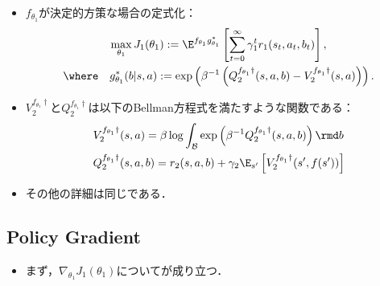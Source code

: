 \documentclass[a4paper,10pt,dvipdfmx]{jsarticle}
\begin{document}
\begin{itemize}
    \item $f_{\theta_1}$が決定的方策な場合の定式化：
    \begin{gather}
        \max_{\theta_1} J_1(\theta_1):=\E^{f_{\theta_1}g_{\theta_1}^*}\left[\sum_{t=0}^\infty \gamma_1^tr_1(s_t,a_t,b_t)\right],\\
        \where\quad g_{\theta_1}^*(b|s,a):=\exp\left(\beta^{-1}\left(Q_2^{f_{\theta_1}\dag}(s,a,b)-V_2^{f_{\theta_1}\dag}(s,a)\right)\right).
    \end{gather}
    \item $V_2^{f_{\theta_1}\dag}$と$Q_2^{f_{\theta_1}\dag}$は以下のBellman方程式を満たすような関数である：
    \begin{align}
        &V_2^{f_{\theta_1}\dag}(s,a)=\beta\log\int_{\mathcal{B}}\exp\left(\beta^{-1}Q_2^{f_{\theta_1}\dag}(s,a,b)\right)\rmd b\\
        &Q_2^{f_{\theta_1}\dag}(s,a,b)=r_2(s,a,b)+\gamma_2\E_{s'}\left[V_2^{f_{\theta_1}\dag}(s',f(s'))\right]
    \end{align}
    \item その他の詳細は同じである．
\end{itemize}


\subsection{Policy Gradient}

\begin{itemize}
    \item まず，$\nabla_{\theta_1}J_1(\theta_1)$についてが成り立つ．
\end{itemize}
\end{document}
